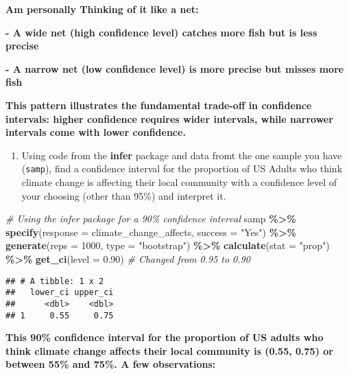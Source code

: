 \documentclass[
]{article}
\newenvironment{Shaded}{\begin{snugshade}}{\end{snugshade}}
\newcommand{\AttributeTok}[1]{\textcolor[rgb]{0.13,0.29,0.53}{#1}}
\newcommand{\CommentTok}[1]{\textcolor[rgb]{0.56,0.35,0.01}{\textit{#1}}}
\newcommand{\DecValTok}[1]{\textcolor[rgb]{0.00,0.00,0.81}{#1}}
\newcommand{\FloatTok}[1]{\textcolor[rgb]{0.00,0.00,0.81}{#1}}
\newcommand{\FunctionTok}[1]{\textcolor[rgb]{0.13,0.29,0.53}{\textbf{#1}}}
\newcommand{\NormalTok}[1]{#1}
\newcommand{\SpecialCharTok}[1]{\textcolor[rgb]{0.81,0.36,0.00}{\textbf{#1}}}
\newcommand{\StringTok}[1]{\textcolor[rgb]{0.31,0.60,0.02}{#1}}
\providecommand{\tightlist}{%
  \setlength{\itemsep}{0pt}\setlength{\parskip}{0pt}}
\begin{document}
\textbf{Am personally Thinking of it like a net:}

\textbf{- A wide net (high confidence level) catches more fish but is
less precise}

\textbf{- A narrow net (low confidence level) is more precise but misses
more fish}

\textbf{This pattern illustrates the fundamental trade-off in confidence
intervals: higher confidence requires wider intervals, while narrower
intervals come with lower confidence.}

\begin{enumerate}
\def\labelenumi{\arabic{enumi}.}
\tightlist
\item
  Using code from the \textbf{infer} package and data fromt the one
  sample you have (\texttt{samp}), find a confidence interval for the
  proportion of US Adults who think climate change is affecting their
  local community with a confidence level of your choosing (other than
  95\%) and interpret it.
\end{enumerate}

\begin{Shaded}
\begin{Highlighting}[]
\CommentTok{\# Using the infer package for a 90\% confidence interval}
\NormalTok{samp }\SpecialCharTok{\%\textgreater{}\%}
  \FunctionTok{specify}\NormalTok{(}\AttributeTok{response =}\NormalTok{ climate\_change\_affects, }\AttributeTok{success =} \StringTok{"Yes"}\NormalTok{) }\SpecialCharTok{\%\textgreater{}\%}
  \FunctionTok{generate}\NormalTok{(}\AttributeTok{reps =} \DecValTok{1000}\NormalTok{, }\AttributeTok{type =} \StringTok{"bootstrap"}\NormalTok{) }\SpecialCharTok{\%\textgreater{}\%}
  \FunctionTok{calculate}\NormalTok{(}\AttributeTok{stat =} \StringTok{"prop"}\NormalTok{) }\SpecialCharTok{\%\textgreater{}\%}
  \FunctionTok{get\_ci}\NormalTok{(}\AttributeTok{level =} \FloatTok{0.90}\NormalTok{)  }\CommentTok{\# Changed from 0.95 to 0.90}
\end{Highlighting}
\end{Shaded}

\begin{verbatim}
## # A tibble: 1 x 2
##   lower_ci upper_ci
##      <dbl>    <dbl>
## 1     0.55     0.75
\end{verbatim}

\textbf{This 90\% confidence interval for the proportion of US adults
who think climate change affects their local community is (0.55, 0.75)
or between 55\% and 75\%. A few observations:}
\end{document}
